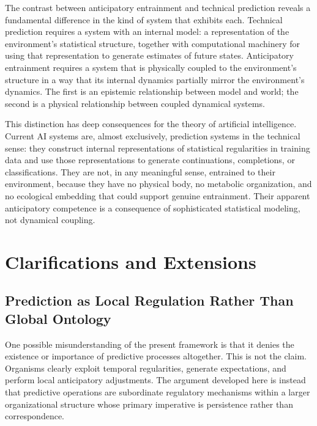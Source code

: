 \documentclass[12pt,a4paper]{report}
\theoremstyle{flyxion}
\begin{document}
The contrast between anticipatory entrainment and technical prediction reveals a fundamental difference in the kind of system that exhibits each. Technical prediction requires a system with an internal model: a representation of the environment's statistical structure, together with computational machinery for using that representation to generate estimates of future states. Anticipatory entrainment requires a system that is physically coupled to the environment's structure in a way that its internal dynamics partially mirror the environment's dynamics. The first is an epistemic relationship between model and world; the second is a physical relationship between coupled dynamical systems.

This distinction has deep consequences for the theory of artificial intelligence. Current AI systems are, almost exclusively, prediction systems in the technical sense: they construct internal representations of statistical regularities in training data and use those representations to generate continuations, completions, or classifications. They are not, in any meaningful sense, entrained to their environment, because they have no physical body, no metabolic organization, and no ecological embedding that could support genuine entrainment. Their apparent anticipatory competence is a consequence of sophisticated statistical modeling, not dynamical coupling.

\chapter{Clarifications and Extensions}

\section{Prediction as Local Regulation Rather Than Global Ontology}

One possible misunderstanding of the present framework is that it denies the existence or importance of predictive processes altogether. This is not the claim. Organisms clearly exploit temporal regularities, generate expectations, and perform local anticipatory adjustments. The argument developed here is instead that predictive operations are subordinate regulatory mechanisms within a larger organizational structure whose primary imperative is persistence rather than correspondence.
\end{document}
